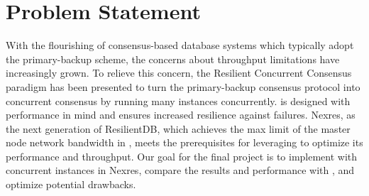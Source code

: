 \section{Problem Statement}
\par With the flourishing of consensus-based database systems which typically adopt the primary-backup scheme, 
the concerns about throughput limitations have increasingly grown. To relieve this concern, the Resilient 
Concurrent Consensus paradigm has been presented to turn the primary-backup consensus protocol into concurrent 
consensus by running many instances concurrently. \RCC{} is designed with performance in mind and ensures increased 
resilience against failures. Nexres, as the next generation of ResilientDB, which achieves the max limit of 
the master node network bandwidth in \PBFT{}, meets the prerequisites for leveraging \RCC{} to optimize its performance 
and throughput. Our goal for the final project is to implement \RCC{} with concurrent \PBFT{} instances in Nexres, compare 
the results and performance with \PBFT{}, and optimize potential drawbacks.